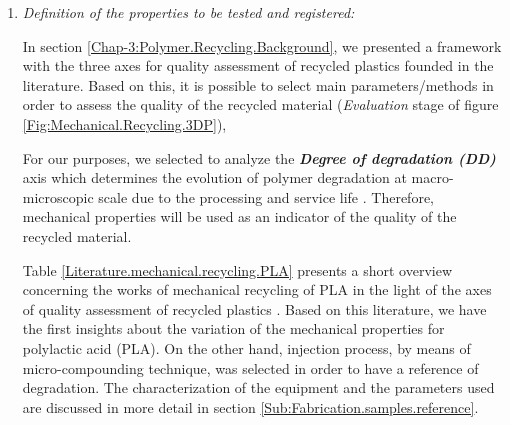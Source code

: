 \begin{enumerate}[leftmargin=0in, label=\emph{\alph*}.]
	
	\item \textit{Definition of the properties to be tested and registered: }

In section \ref{Chap-3:Polymer.Recycling.Background}, we presented a framework with the  three axes for quality assessment of recycled plastics founded in the literature.
Based on this, it is possible to select main parameters/methods in order to assess the quality of the recycled material (\textit{Evaluation} stage of figure \ref{Fig:Mechanical.Recycling.3DP}), 

For our purposes, we selected to analyze the \textbf{\textit{Degree of degradation (DD)}} axis which determines the evolution of polymer degradation at macro-microscopic scale due to the processing and service life \textcite{Vilaplana2008}.
Therefore, mechanical properties will be used as an indicator of the quality of the recycled material.
		
Table \ref{Literature.mechanical.recycling.PLA}  presents a short overview concerning the works of mechanical recycling of PLA in the light of the  axes of quality assessment of recycled plastics
	\parencite{Soroudi2013,Hamad2013}.
Based on this literature,  we have the first insights about the variation of the mechanical properties for polylactic acid (PLA).
%
On the other hand, injection process, by means of micro-compounding technique, was selected in order to have a reference of degradation.
The characterization of the equipment and the parameters used  are discussed in more detail in section \ref{Sub:Fabrication.samples.reference}. 
	

\end{enumerate}
